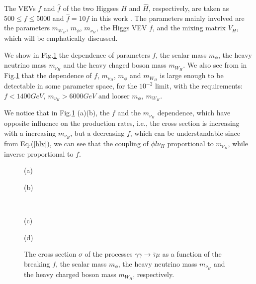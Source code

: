 \documentclass[preprint,aps,12pt,showpacs,nofootinbib,tightenlines]{revtex4}
\begin{document}

The VEVs $f$ and $\hat f$ of the two Higgses $H$ and $\hat H$, respectively,
are taken as $ 500\leq f\leq 5000$ and $\hat f = 10f$ in this work \cite{0711.1238}.
The parameters mainly involved are the parameters $m_{W_H}$, $m_\phi $, $m_{\nu_H}$, the Higgs VEV $f$,
 and the mixing matrix $V_H$,  which will be emphatically discussed.


We show in Fig.\ref{fig5} the dependence of parameters $f$, the scalar mass $m_\phi $, the heavy neutrino mass $m_{\nu_H}$ and the
heavy chaged boson mass $m_{W_H}$. We also see from in Fig.\ref{fig5} that the dependence of $f$, $m_{\nu_H}$,  $m_\phi $ and $m_{W_H}$ is
large enough to be detectable in some parameter space, for the $10^{-2}$ limit, with the requirements:
$f< 1400 GeV, ~m_{\nu_H}> 6000 GeV$ and looser $m_\phi,~m_{W_H}$.


We notice that in Fig.\ref{fig5} (a)(b), the $f$ and the $m_{\nu_H}$ dependence, which have opposite influence on the production rates,
i.e., the cross section is increasing with a increasing $m_{\nu_H}$, but a decreasing $f$,
which can be understandable since from Eq.(\ref{hlv}),
we can see that the coupling of $\phi \bar l\nu_H $ proportional to $m_{\nu_H}$, while inverse proportional to $f$.


\def\figsubcap#1{\par\noindent\centering\footnotesize(#1)}
\begin{figure}[bht]
\begin{center}
\hspace{-2.5cm}
 \parbox{7.05cm}{ \vspace{-1.2cm}\figsubcap{a} }
 \parbox{7.05cm}{ \vspace{-1.cm}\figsubcap{b} } \vspace{0.2cm} \\ \hspace{-2.5cm}
 \parbox{7.05cm}{ \vspace{-1.2cm}\figsubcap{c} }
 \parbox{7.05cm}{ \vspace{-1.cm}\figsubcap{d} }
   \caption{ The cross section $\sigma$ of the processes $\gamma\gamma
         \to  \bar \tau \mu $ as a function of the breaking $f$, the scalar mass $m_\phi $, the heavy neutrino mass $m_{\nu_H}$ and the
         heavy charged boson mass $m_{W_H}$, respectively.
\label{fig5} }
\end{center}
\end{figure}
\end{document}

